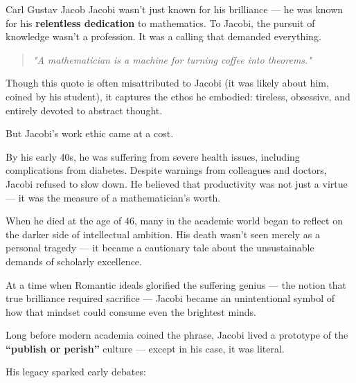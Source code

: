 \begin{tcolorbox}[colback=gray!5!white, colframe=gray!50!black, title={Historical Sidebar: Jacobi and the Perils of Mathematical Martyrdom}, breakable]

    Carl Gustav Jacob Jacobi wasn’t just known for his brilliance — he was known for his \textbf{relentless dedication} to mathematics. To Jacobi, the pursuit of knowledge wasn’t a profession. It was a calling that demanded everything.
    
    \begin{quote}
    \textit{"A mathematician is a machine for turning coffee into theorems."}
    \end{quote}
    
    Though this quote is often misattributed to Jacobi (it was likely about him, coined by his student), it captures the ethos he embodied: tireless, obsessive, and entirely devoted to abstract thought.
    
    \medskip
    
    But Jacobi’s work ethic came at a cost.
    
    By his early 40s, he was suffering from severe health issues, including complications from diabetes. Despite warnings from colleagues and doctors, Jacobi refused to slow down. He believed that productivity was not just a virtue — it was the measure of a mathematician’s worth.
    
    \medskip
    
    When he died at the age of 46, many in the academic world began to reflect on the darker side of intellectual ambition. His death wasn’t seen merely as a personal tragedy — it became a cautionary tale about the unsustainable demands of scholarly excellence.
    
    \medskip
    
    At a time when Romantic ideals glorified the suffering genius — the notion that true brilliance required sacrifice — Jacobi became an unintentional symbol of how that mindset could consume even the brightest minds.
    
    \begin{tcolorbox}[colback=white, colframe=gray!50!black, title={The Birth of "Publish or Perish"?}, fonttitle=\bfseries]
    Long before modern academia coined the phrase,  
    Jacobi lived a prototype of the \textbf{“publish or perish”} culture —  
    except in his case, it was literal.
    \end{tcolorbox}
    
    His legacy sparked early debates:
    

\end{tcolorbox}

